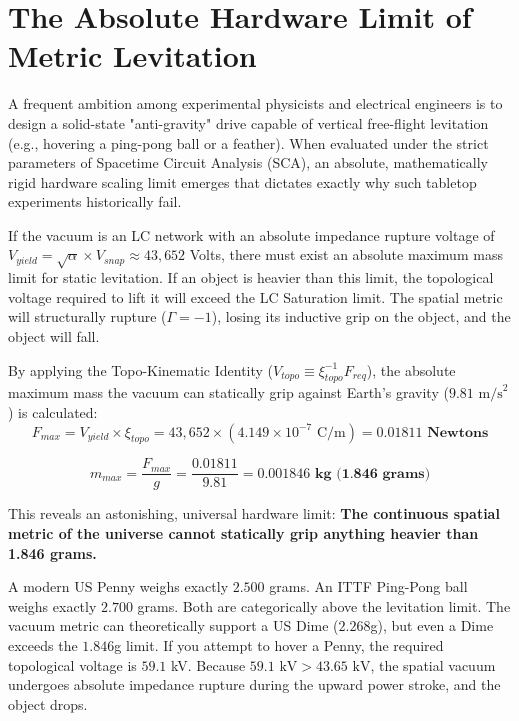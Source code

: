 \section{The Absolute Hardware Limit of Metric Levitation}
A frequent ambition among experimental physicists and electrical engineers is to design a solid-state "anti-gravity" drive capable of vertical free-flight levitation (e.g., hovering a ping-pong ball or a feather). When evaluated under the strict parameters of Spacetime Circuit Analysis (SCA), an absolute, mathematically rigid hardware scaling limit emerges that dictates exactly why such tabletop experiments historically fail.

If the vacuum is an LC network with an absolute impedance rupture voltage of $V_{yield} = \sqrt{\alpha} \times V_{snap} \approx 43,652$ Volts, there must exist an absolute maximum mass limit for static levitation. If an object is heavier than this limit, the topological voltage required to lift it will exceed the LC Saturation limit. The spatial metric will structurally rupture ($\Gamma = -1$), losing its inductive grip on the object, and the object will fall.

By applying the Topo-Kinematic Identity ($V_{topo} \equiv \xi_{topo}^{-1} F_{req}$), the absolute maximum mass the vacuum can statically grip against Earth's gravity ($9.81 \text{ m/s}^2$) is calculated:
\begin{equation}
    F_{max} = V_{yield} \times \xi_{topo} = 43{,}652 \times (4.149 \times 10^{-7} \text{ C/m}) = \mathbf{0.01811 \text{ Newtons}}
\end{equation}
\begin{tcolorbox}[colback=white, colframe=black]
\begin{equation}
    m_{max} = \frac{F_{max}}{g} = \frac{0.01811}{9.81} = \mathbf{0.001846 \text{ kg (1.846 grams)}}
\end{equation}
\end{tcolorbox}

This reveals an astonishing, universal hardware limit: \textbf{The continuous spatial metric of the universe cannot statically grip anything heavier than 1.846 grams.} 

A modern US Penny weighs exactly $2.500$ grams. An ITTF Ping-Pong ball weighs exactly $2.700$ grams. Both are categorically above the levitation limit. The vacuum metric can theoretically support a US Dime ($2.268$g), but even a Dime exceeds the $1.846$g limit. If you attempt to hover a Penny, the required topological voltage is $59.1$ kV. Because $59.1 \text{ kV} > 43.65 \text{ kV}$, the spatial vacuum undergoes absolute impedance rupture during the upward power stroke, and the object drops.

